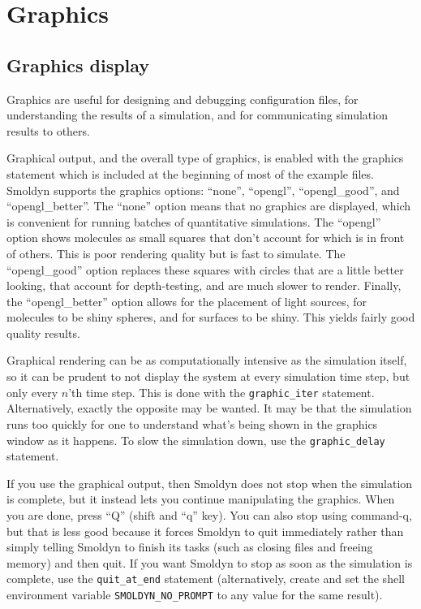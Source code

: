 \documentclass {scrbook}
\newcommand {\ttt} {\texttt}
\begin{document}
\chapter{Graphics}

\section{Graphics display}

Graphics are useful for designing and debugging configuration files, for understanding the results of a simulation, and for communicating simulation results to others.

Graphical output, and the overall type of graphics, is enabled with the graphics statement which is included at the beginning of most of the example files. Smoldyn supports the graphics options: ``none'', ``opengl'', ``opengl\_good'', and ``opengl\_better''. The ``none'' option means that no graphics are displayed, which is convenient for running batches of quantitative simulations. The ``opengl'' option shows molecules as small squares that don't account for which is in front of others. This is poor rendering quality but is fast to simulate. The ``opengl\_good'' option replaces these squares with circles that are a little better looking, that account for depth-testing, and are much slower to render. Finally, the ``opengl\_better'' option allows for the placement of light sources, for molecules to be shiny spheres, and for surfaces to be shiny. This yields fairly good quality results.

Graphical rendering can be as computationally intensive as the simulation itself, so it can be prudent to not display the system at every simulation time step, but only every $n$'th time step. This is done with the \ttt{graphic\_iter} statement. Alternatively, exactly the opposite may be wanted. It may be that the simulation runs too quickly for one to understand what's being shown in the graphics window as it happens. To slow the simulation down, use the \ttt{graphic\_delay} statement.

If you use the graphical output, then Smoldyn does not stop when the simulation is complete, but it instead lets you continue manipulating the graphics. When you are done, press ``Q'' (shift and ``q'' key). You can also stop using command-q, but that is less good because it forces Smoldyn to quit immediately rather than simply telling Smoldyn to finish its tasks (such as closing files and freeing memory) and then quit. If you want Smoldyn to stop as soon as the simulation is complete, use the \ttt{quit\_at\_end} statement (alternatively, create and set the shell environment variable \ttt{SMOLDYN\_NO\_PROMPT} to any value for the same result).
\end{document}
